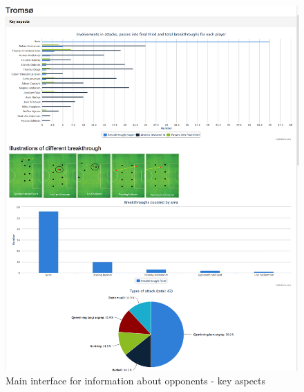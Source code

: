\begin{figure}[ht!]
\centering
\includegraphics[width=1\textwidth]{images/general/team_analysis1.png}
\caption{Main interface for information about opponents - key aspects}
\label{fig:team_analysis1}
\end{figure}

